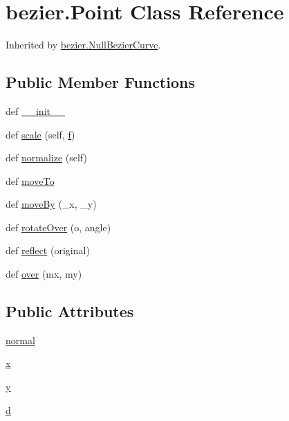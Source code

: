 \hypertarget{classbezier_1_1_point}{}\section{bezier.\+Point Class Reference}
\label{classbezier_1_1_point}


Inherited by \hyperlink{classbezier_1_1_null_bezier_curve}{bezier.\+Null\+Bezier\+Curve}.

\subsection*{Public Member Functions}
\begin{DoxyCompactItemize}
\item 
def \hyperlink{classbezier_1_1_point_a68259b21ff696fd50080620830eb50e4}{\+\_\+\+\_\+init\+\_\+\+\_\+}
\item 
def \hyperlink{classbezier_1_1_point_a274eed2d595fbf1e04441634c3f32f18}{scale} (self, \hyperlink{namespacebezier_ad649969fef81af63abc92b1015251242}{f})
\item 
def \hyperlink{classbezier_1_1_point_affa05deaf327ba3f06ad22549f58aa62}{normalize} (self)
\item 
def \hyperlink{classbezier_1_1_point_a1e926219773aa0684a6329c8aaca6903}{move\+To}
\item 
def \hyperlink{classbezier_1_1_point_aa2ac4c3811bf9f6ada0ad9ae37d0b49c}{move\+By} (\+\_\+x, \+\_\+y)
\item 
def \hyperlink{classbezier_1_1_point_ab80043486d5208080b886508bc7d6a45}{rotate\+Over} (o, angle)
\item 
def \hyperlink{classbezier_1_1_point_a69e0e3843fed67dc4def6003fc47943f}{reflect} (original)
\item 
def \hyperlink{classbezier_1_1_point_ac46a979a6b714559a066096cb10f23e4}{over} (mx, my)
\end{DoxyCompactItemize}
\subsection*{Public Attributes}
\begin{DoxyCompactItemize}
\item 
\hyperlink{classbezier_1_1_point_a7aae96210ba0b027585354da7a89ed70}{normal}
\item 
\hyperlink{classbezier_1_1_point_a1fafe43db62786b6440ed7da2f65c94c}{x}
\item 
\hyperlink{classbezier_1_1_point_afef026c2349e08af94ac206129e0b1bf}{y}
\item 
\hyperlink{classbezier_1_1_point_a7646bb0cfbce0ffe70b3a91c8cfbac16}{d}
\end{DoxyCompactItemize}



